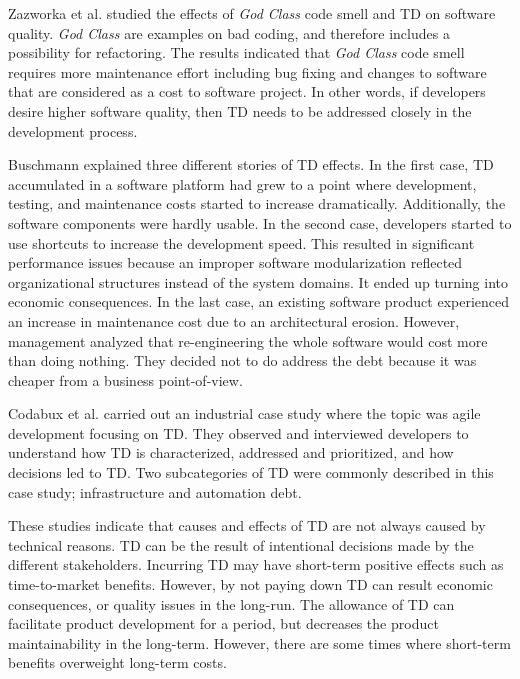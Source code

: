 Zazworka et al.\cite{zazworka2011investigating} studied the effects of \textit{God Class} code smell and TD on software quality. \textit{God Class} are examples on bad coding, and therefore includes a possibility for refactoring\cite{Zazworka:2011:PDD:1985362.1985372}. The results indicated that \textit{God Class} code smell requires more maintenance effort including bug fixing and changes to software that are considered as a cost to software project. In other words, if developers desire higher software quality, then TD needs to be addressed closely in the development process.

Buschmann\cite{buschmann2011pay} explained three different stories of TD effects. In the first case, TD accumulated in a software platform had grew to a point where development, testing, and maintenance costs started to increase dramatically. Additionally, the software components were hardly usable. In the second case, developers started to use shortcuts to increase the development speed. This resulted in significant performance issues because an improper software modularization reflected organizational structures instead of the system domains. It ended up turning into economic consequences. In the last case, an existing software product experienced an increase in maintenance cost due to an architectural erosion. However, management analyzed that re-engineering the whole software would cost more than doing nothing. They decided not to do address the debt because it was cheaper from a business point-of-view.

Codabux et al.\cite{p8-codabux} carried out an industrial case study where the topic was agile development focusing on TD. They observed and interviewed developers to understand how TD is characterized, addressed and prioritized, and how decisions led to TD. Two subcategories of TD were commonly described in this case study; infrastructure and automation debt. 

These studies indicate that causes and effects of TD are not always caused by technical reasons. TD can be the result of intentional decisions made by the different stakeholders. Incurring TD may have short-term positive effects such as time-to-market benefits. However, by not paying down TD can result economic consequences, or quality issues in the long-run. The allowance of TD can facilitate product development for a period, but decreases the product maintainability in the long-term. However, there are some times where short-term benefits overweight long-term costs\cite{guo2011tracking}. 


